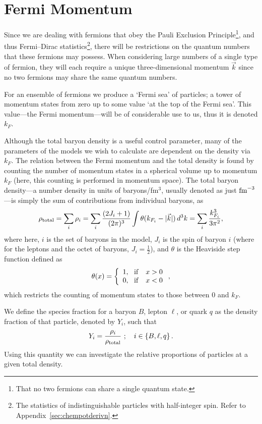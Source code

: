 \documentclass[11pt,a4paper,twoside]{carrollthesis}
\newcommand{\be}{\begin{equation}}
\newcommand{\ee}{\end{equation}}
\newcommand{\half}{\frac{1}{2}}
\newcommand{\emdash}{\hspace{1pt}---\hspace{1pt}}
\begin{document}
\section{Fermi Momentum}\label{sec:kf}
%
Since we are dealing with fermions that obey the Pauli Exclusion
Principle\footnote{That no two fermions can share a single quantum
  state.}, and thus Fermi--Dirac statistics\footnote{The statistics of
  indistinguishable particles with half-integer spin. Refer to
  Appendix~\ref{sec:chempotderivn}.}, there will be restrictions on the
quantum numbers that these fermions may possess. When considering
large numbers of a single type of fermion, they will each require a
unique three-dimensional momentum $\vec{k}$ since no two fermions may
share the same quantum numbers.\par
%
For an ensemble of fermions we produce a `Fermi sea' of particles; a
tower of momentum states from zero up to some value `at the top of the
Fermi sea'. This value\emdash the Fermi momentum\emdash will be of
considerable use to us, thus it is denoted $k_F$.\par
%
Although the total baryon density is a useful control parameter, many of
the parameters of the models we wish to calculate are dependent on the
density via $k_F$. The relation between the Fermi momentum and the
total density is found by counting the number of momentum states in a
spherical volume up to momentum $k_F$ (here, this counting is performed
in momentum space). The total baryon density\emdash a number density
in units of baryons/fm$^{3}$, usually denoted as just ${\rm
  fm}^{-3}$\emdash is simply the sum of contributions from individual
baryons, as
%
\be \label{eq:rho} \rho_{\rm total} = \sum_i \rho_i = \sum_i
\frac{(2J_i +1)}{(2\pi)^3}\int \theta(k_{F_i}-|\vec{k}|) \, d^3k =
\sum_i \frac{k_{F_i}^3}{3\pi^2}, \ee
%
where here, $i$ is the set of baryons in the model, $J_i$ is the spin
of baryon $i$ (where for the leptons and the octet of baryons, $J_i =
\half$), and $\theta$ is the Heaviside step function defined as
%
\be \label{eq:Heaviside} \theta(x) =
\left\{ \begin{array}{ll}1,\ \ {\rm if} & x > 0\\0,\ \ {\rm if} & x <
  0\end{array} \right. , \ee
%
which restricts the counting of momentum states to those between $0$
and $k_F$.\par
%
We define the species fraction for a baryon $B$, lepton $\ell$, or
quark $q$ as the density fraction of that particle, denoted by $Y_i$,
such that
%
\be 
\label{eq:Y}
Y_i = \frac{\rho_i}{\rho_{\rm total}}\ ;\quad i\in \{
B,\ell,q\} \, . \ee
%
Using this quantity we can investigate the relative proportions of
particles at a given total density.
%
\end{document}
